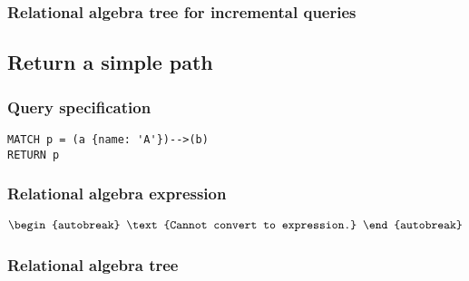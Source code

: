 \subsubsection*{Relational algebra tree for incremental queries}


\subsection{Return a simple path}

\subsubsection*{Query specification}

\begin{lstlisting}
MATCH p = (a {name: 'A'})-->(b)
RETURN p
\end{lstlisting}

\subsubsection*{Relational algebra expression}

\begin{align*}
\begin{autobreak}
\text{Cannot convert to expression.}
\end{autobreak}
\end{align*}

\subsubsection*{Relational algebra tree}


